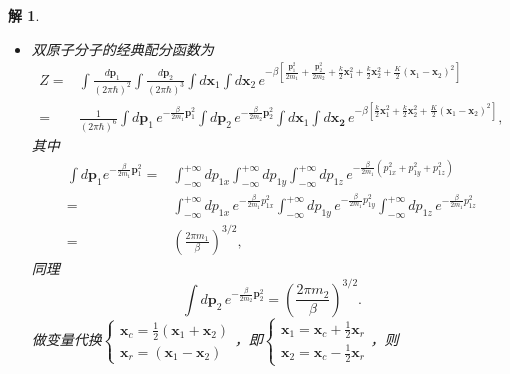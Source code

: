 \documentclass[UTF8,10pt,a4paper]{article}
\theoremstyle{Problem}
\theoremstyle{Solution}
\newtheorem*{sol}{解}
\begin{document}
\begin{sol}
    \begin{itemize}
        \item[(a)] 双原子分子的经典配分函数为
              \begin{align}
                  \label{3-partition-func}
                  \nonumber Z= & \int\frac{d\bm{p}_1}{(2\pi\hbar)^2}\int\frac{d\bm{p}_2}{(2\pi\hbar)^3}\int d\bm{x}_1\int d\bm{x}_2\,e^{-\beta\left[\frac{\bm{p}_1^2}{2m_1}+\frac{\bm{p}_2^2}{2m_2}+\frac{k}{2}\bm{x}_1^2+\frac{k}{2}\bm{x}_2^2+\frac{K}{2}(\bm{x}_1-\bm{x}_2)^2\right]}                                                \\
                  =            & \frac{1}{(2\pi\hbar)^6}\int d\bm{p}_1\,e^{-\frac{\beta}{2m_1}\bm{p}_1^2}\int d\bm{p}_2\,e^{-\frac{\beta}{2m_2}\bm{p}_2^2}\int d\bm{x}_1\int d\bm{x_2}\,e^{-\beta\left[\frac{k}{2}\bm{x}_1^2+\frac{k}{2}\bm{x}_2^2+\frac{K}{2}(\bm{x}_1-\bm{x}_2)^2\right]},
              \end{align}
              其中
              \begin{align}
                  \label{3-int-p1}
                  \nonumber\int d\bm{p}_1e^{-\frac{\beta}{2m_1}\bm{p}_1^2}= & \int_{-\infty}^{+\infty}dp_{1x}\int_{-\infty}^{+\infty}dp_{1y}\int_{-\infty}^{+\infty}dp_{1z}\,e^{-\frac{\beta}{2m_1}(p_{1x}^2+p_{1y}^2+p_{1z}^2)}                                               \\
                  \nonumber=                                                & \int_{-\infty}^{+\infty}dp_{1x}\,e^{-\frac{\beta}{2m_1}p_{1x}^2}\int_{-\infty}^{+\infty}dp_{1y}\,e^{-\frac{\beta}{2m_1}p_{1y}^2}\int_{-\infty}^{+\infty}dp_{1z}\,e^{-\frac{\beta}{2m_1}p_{1z}^2} \\
                  =                                                         & \left(\frac{2\pi m_1}{\beta}\right)^{3/2},
              \end{align}
              同理
              \begin{equation}
                  \label{3-int-p2}
                  \int d\bm{p}_2\,e^{-\frac{\beta}{2m_2}\bm{p}_2^2}=\left(\frac{2\pi m_2}{\beta}\right)^{3/2}.
              \end{equation}
              做变量代换$\left\{\begin{array}{l}\bm{x}_c=\frac{1}{2}(\bm{x}_1+\bm{x}_2)\\\bm{x}_r=(\bm{x}_1-\bm{x}_2)\end{array}\right.$，即$\left\{\begin{array}{l}\bm{x}_1=\bm{x}_c+\frac{1}{2}\bm{x}_r\\\bm{x}_2=\bm{x}_c-\frac{1}{2}\bm{x}_r\end{array}\right.$，则

\end{itemize}
\end{sol}
\end{document}
